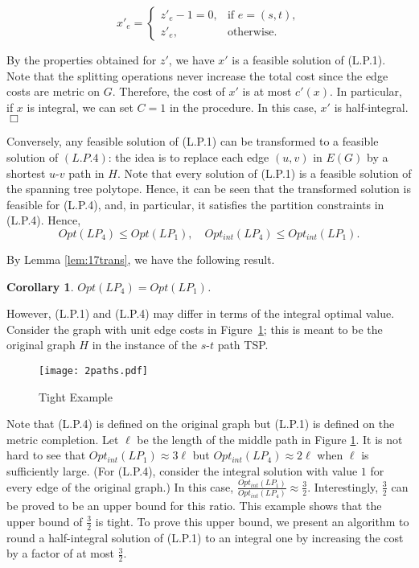 \documentclass[11pt]{article}
\newcommand{\qed}{\hspace*{\fill}$\Box$}
\newtheorem{corollary}[theorem]{Corollary}
\newenvironment{proof}[1][Proof. ]{\noindent {\bf #1 }}{\qed}
\begin{document}
\begin{proof}
\begin{equation}
x'_e = \begin{cases}
  z'_e-1=0, & \text{if } e=(s,t), \\ \nonumber
  z'_e, & \text{otherwise}.
\end{cases}
\end{equation}

By the properties obtained for $z'$, we have $x'$ is a feasible
solution of (L.P.1). Note that the splitting operations never
increase the total cost since the edge costs are metric on $G$.
Therefore, the cost of $x'$ is at most $c'(x)$. In particular,
if $x$ is integral, we can set $C=1$ in the procedure.
In this case, $x'$ is half-integral.
\end{proof}

Conversely, any feasible solution of (L.P.1) can be transformed to
a feasible solution of $(L.P.4)$:
the idea is to replace each edge $(u,v)$ in $E(G)$
by a shortest $u$-$v$ path in $H$.
Note that every solution of (L.P.1) is a feasible solution of
the spanning tree polytope. Hence,
it can be seen that the transformed solution is feasible for (L.P.4),
and, in particular, it satisfies the partition constraints in (L.P.4).
Hence,
 \begin{equation}\label{LP4lesLP1}
 Opt(LP_4)\leq Opt(LP_1), \quad Opt_{int}(LP_4)\leq Opt_{int}(LP_1).
 \end{equation}

By Lemma \ref{lem:17trans}, we have the following result.

\begin{corollary}\label{cor:equiv}
$Opt(LP_4)=Opt(LP_1)$.
\end{corollary}

However, (L.P.1) and (L.P.4) may differ
in terms of the integral optimal value.
Consider the graph with unit edge costs in Figure~\ref{tightExample};
this is meant to be the original graph $H$ in the instance
of the $s$-$t$ path TSP.

\begin{figure}[h]
\begin{center}
\texttt{[image: 2paths.pdf]}\\
  \caption{Tight Example}
  \label{tightExample}
\end{center}
\end{figure}

Note that (L.P.4) is defined on the original graph but (L.P.1) is
defined on the metric completion. Let $\ell$ be the length of the
middle path in Figure \ref{tightExample}. It is not hard to see
that $Opt_{int}(LP_1)\approx 3\ell$ but $Opt_{int}(LP_4)\approx
2\ell$ when $\ell$ is sufficiently large. (For (L.P.4), consider the integral solution with value $1$ for
every edge of the original graph.) In this case,
$\frac{Opt_{int}(LP_1)}{Opt_{int}(LP_4)}\approx \frac{3}{2}$.
Interestingly, $\frac{3}{2}$ can be proved to be an upper bound for this
ratio. This example shows that the upper bound of $\frac{3}{2}$ is tight. To prove this upper bound, we present an algorithm to round a half-integral solution of (L.P.1) to an integral one by increasing the cost by a factor of at most $\frac{3}{2}$.
\end{document}

